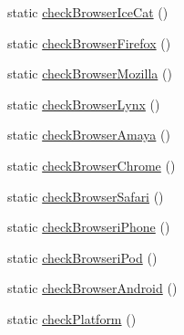 \begin{DoxyCompactItemize}
\item 
static \hyperlink{class_browser_afe82f2378ec823ddce7bb9b4b94d2498}{checkBrowserIceCat} ()
\item 
static \hyperlink{class_browser_a2cc5416a5818dad8709f8d98f087ab86}{checkBrowserFirefox} ()
\item 
static \hyperlink{class_browser_af8e768ede6bd431c4327fe13e98faaf2}{checkBrowserMozilla} ()
\item 
static \hyperlink{class_browser_a2e6ced57558d8abdd309d29b2c686f60}{checkBrowserLynx} ()
\item 
static \hyperlink{class_browser_ac0e7bf4b4ea0400fe9c3b1fda8bef12a}{checkBrowserAmaya} ()
\item 
static \hyperlink{class_browser_a594aa2d53052eff4dec350c73c17792a}{checkBrowserChrome} ()
\item 
static \hyperlink{class_browser_af432b4350c35ecbe37cabf63c65e0162}{checkBrowserSafari} ()
\item 
static \hyperlink{class_browser_aa6f72bd91d6998ead0a690b3494fc93a}{checkBrowseriPhone} ()
\item 
static \hyperlink{class_browser_a97ec9d2c3d60e29269a8c708d3839f89}{checkBrowseriPod} ()
\item 
static \hyperlink{class_browser_a89f8b25f971486c7c56c9cfa73f16b74}{checkBrowserAndroid} ()
\item 
static \hyperlink{class_browser_a0a9f16fb5c750d59a8d15a34a27b05f1}{checkPlatform} ()
\end{DoxyCompactItemize}
